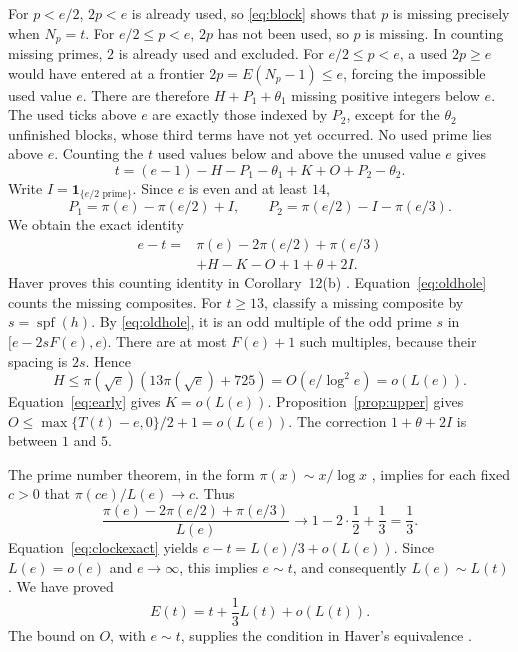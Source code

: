 \documentclass[11pt]{article}
\theoremstyle{remark}
\newcommand{\spf}{\operatorname{spf}}
\newcommand{\ind}[1]{\mathbf{1}_{\{#1\}}}
\newcommand{\pos}[1]{\max\{#1,0\}}
\begin{document}
For $p<e/2$, $2p<e$ is already used, so \eqref{eq:block}
shows that $p$ is missing precisely when $N_p=t$.
For $e/2\leq p<e$, $2p$ has not been used, so $p$ is missing.
In counting missing primes, $2$ is already used and excluded.
For $e/2\leq p<e$, a used $2p\geq e$ would have entered at a frontier
$2p=E(N_p-1)\leq e$, forcing the impossible used value $e$.
There are therefore $H+P_1+\theta_1$ missing positive integers
below $e$. The used ticks above $e$ are exactly those indexed by
$P_2$, except for the $\theta_2$ unfinished blocks, whose third terms
have not yet occurred.
No used prime lies above $e$. Counting the $t$ used values below
and above the unused value $e$ gives
\[
 t=(e-1)-H-P_1-\theta_1+K+O+P_2-\theta_2.
\]
Write $I=\ind{e/2\text{ prime}}$. Since $e$ is even and at least $14$,
\[
 P_1=\pi(e)-\pi(e/2)+I,\qquad
 P_2=\pi(e/2)-I-\pi(e/3).
\]
We obtain the exact identity
\begin{equation}\label{eq:clockexact}
 \begin{split}
 e-t={}&\pi(e)-2\pi(e/2)+\pi(e/3)\\
       &+H-K-O+1+\theta+2I.
 \end{split}
\end{equation}
Haver proves this counting identity in Corollary~12(b) \cite{haver}.
Equation~\eqref{eq:oldhole} counts the missing composites.
For $t\geq13$, classify a missing composite by $s=\spf(h)$.
By \eqref{eq:oldhole}, it is an odd multiple of the odd prime $s$
in $[e-2sF(e),e)$. There are at most $F(e)+1$ such multiples,
because their spacing is $2s$. Hence
\[
 H\leq\pi(\sqrt e)(13\pi(\sqrt e)+725)
             =O(e/\log^2 e)=o(L(e)).
\]
Equation~\eqref{eq:early} gives $K=o(L(e))$.
Proposition~\ref{prop:upper} gives
$O\leq\pos{T(t)-e}/2+1=o(L(e))$.
The correction $1+\theta+2I$ is between $1$ and $5$.

The prime number theorem, in the form $\pi(x)\sim x/\log x$
\cite{hadamard,poussin}, implies for each fixed $c>0$ that
$\pi(ce)/L(e)\to c$. Thus
\[
 \frac{\pi(e)-2\pi(e/2)+\pi(e/3)}{L(e)}
            \longrightarrow 1-2\cdot\frac12+\frac13=\frac13.
\]
Equation~\eqref{eq:clockexact} yields
$e-t=L(e)/3+o(L(e))$.
Since $L(e)=o(e)$ and $e\to\infty$, this implies $e\sim t$,
and consequently $L(e)\sim L(t)$. We have proved
\begin{equation}\label{eq:clock}
 E(t)=t+\frac13 L(t)+o(L(t)).
\end{equation}
The bound on $O$, with $e\sim t$, supplies the condition in Haver's
equivalence \cite[Corollaries~2(e), 12(d)]{haver}.
\end{document}
